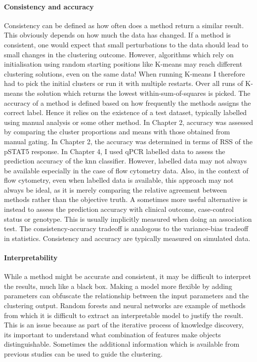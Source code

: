 \paragraph{Consistency and accuracy}
Consistency can be defined as how often does a method return a similar result.
This obviously depends on how much the data has changed.
If a method is consistent, one would expect that small perturbations to the data should lead to small changes in the clustering outcome.
However, algorithms which rely on initialisation using random starting positions like K-means may reach different clustering solutions, even on the same data!
When running K-means I therefore had to pick the initial clusters or run it with multiple restarts.
Over all runs of K-means the solution which returns the lowest within-sum-of-squares is picked.
The accuracy of a method is defined based on how frequently the methods assigns the correct label.
Hence it relies on the existence of a test dataset, typically labelled using manual analysis or some other method.
In Chapter 2, accuracy was assessed by comparing the cluster proportions and means with those obtained from manual gating.
In Chapter 2, the accuracy was determined in terms of RSS of the pSTAT5 response.
In Chapter 4, I used qPCR labelled data to assess the prediction accuracy of the \gls{knn} classifier.
However, labelled data may not always be available especially in the case of flow cytometry data.
Also, in the context of flow cytometry, even when labelled data is available, this approach may not always be ideal,
as it is merely comparing the relative agreement between methods rather than the objective truth.
A sometimes more useful alternative is instead to assess the prediction accuracy with clinical outcome, case-control status or genotype.
This is usually implicitly measured when doing an association test.
The consistency-accuracy tradeoff is analogous to the variance-bias tradeoff in statistics.
Consistency and accuracy are typically measured on simulated data.

\paragraph{Interpretability}
While a method might be accurate and consistent, it may be difficult to interpret the results, much like a black box.
Making a model more flexible by adding parameters can obfuscate the relationship between the input parameters and the clustering output.
Random forests and neural networks are example of methods from which it is difficult to extract an interpretable model to justify the result.
This is an issue because
as part of the iterative process of knowledge discovery, its important to understand what combination of features make objects distinguishable.
Sometimes the additional information which is available from previous studies can be used to guide the clustering.


